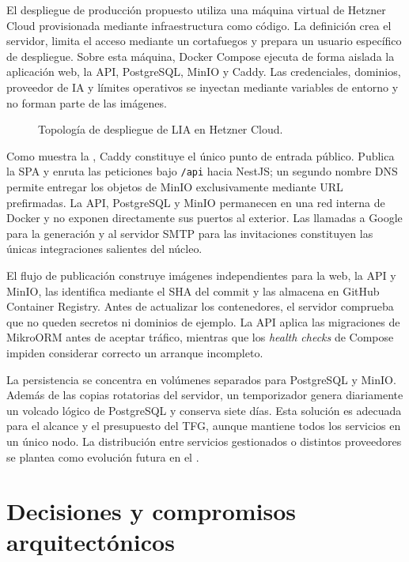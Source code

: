 El despliegue de producción propuesto utiliza una máquina virtual de Hetzner
Cloud provisionada mediante infraestructura como código. La definición crea el servidor, limita
el acceso mediante un cortafuegos y prepara un usuario específico de
despliegue. Sobre esta máquina, Docker Compose ejecuta de forma aislada la
aplicación web, la API, PostgreSQL, MinIO y Caddy. Las credenciales, dominios,
proveedor de IA y límites operativos se inyectan mediante variables de entorno
y no forman parte de las imágenes.

\begin{figure}[htbp]
  \centering
  \resizebox{0.96\textwidth}{!}{
    
  }
  \caption{Topología de despliegue de LIA en Hetzner Cloud.}
  \label{fig:production-infrastructure}
\end{figure}

Como muestra la , Caddy constituye el único
punto de entrada público. Publica la SPA y enruta las peticiones bajo
\texttt{/api} hacia NestJS; un segundo nombre DNS permite entregar los objetos
de MinIO exclusivamente mediante URL prefirmadas. La API, PostgreSQL y MinIO
permanecen en una red interna de Docker y no exponen directamente sus puertos
al exterior. Las llamadas a Google para la generación y al servidor SMTP para
las invitaciones constituyen las únicas integraciones salientes del núcleo.

El flujo de publicación construye imágenes independientes para la web, la API
y MinIO, las identifica mediante el SHA del commit y las almacena en GitHub
Container Registry. Antes de actualizar los contenedores, el servidor comprueba
que no queden secretos ni dominios de ejemplo. La API aplica las migraciones de
MikroORM antes de aceptar tráfico, mientras que los \emph{health checks} de
Compose impiden considerar correcto un arranque incompleto.

La persistencia se concentra en volúmenes separados para PostgreSQL y MinIO.
Además de las copias rotatorias del servidor, un temporizador genera diariamente
un volcado lógico de PostgreSQL y conserva siete días. Esta solución es adecuada
para el alcance y el presupuesto del TFG, aunque mantiene todos los servicios en
un único nodo. La distribución entre servicios gestionados o distintos
proveedores se plantea como evolución futura en el
.

\section{Decisiones y compromisos arquitectónicos}
\label{sec:architecture-decisions}

